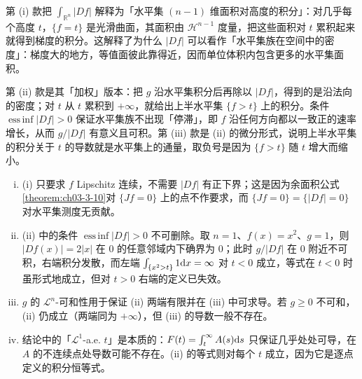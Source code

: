 \documentclass[../../main.tex]{subfiles}%
\begin{document}
\begin{remark}\label{remark:ch03-thm-3-13-动机}
第 (i) 款把 $\int_{\mathbb{R}^n}\lvert Df\rvert$ 解释为「水平集 $(n-1)$ 维面积对高度的积分」：对几乎每个高度 $t$，$\{f=t\}$ 是光滑曲面，其面积由 $\mathcal{H}^{n-1}$ 度量，把这些面积对 $t$ 累积起来就得到梯度的积分。这解释了为什么 $\lvert Df\rvert$ 可以看作「水平集族在空间中的密度」：梯度大的地方，等值面彼此靠得近，因而单位体积内包含更多的水平集面积。

第 (ii) 款是其「加权」版本：把 $g$ 沿水平集积分后再除以 $\lvert Df\rvert$，得到的是沿法向的密度；对 $t$ 从 $t$ 累积到 $+\infty$，就给出上半水平集 $\{f>t\}$ 上的积分。条件 $\operatorname*{ess\,inf}\lvert Df\rvert>0$ 保证水平集族不出现「停滞」，即 $f$ 沿任何方向都以一致正的速率增长，从而 $g/\lvert Df\rvert$ 有意义且可积。第 (iii) 款是 (ii) 的微分形式，说明上半水平集的积分关于 $t$ 的导数就是水平集上的通量，取负号是因为 $\{f>t\}$ 随 $t$ 增大而缩小。
\end{remark}

\begin{remark}\label{remark:ch03-thm-3-13-条件}
\begin{enumerate}[(i)]
\item (i) 只要求 $f$ Lipschitz 连续，不需要 $\lvert Df\rvert$ 有正下界；这是因为余面积公式\cref{theorem:ch03-3-10}对 $\{Jf=0\}$ 上的点不作要求，而 $\{Jf=0\}=\{\lvert Df\rvert=0\}$ 对水平集测度无贡献。%
\item (ii) 中的条件 $\operatorname*{ess\,inf}\lvert Df\rvert>0$ 不可删除。取 $n=1$、$f(x)=x^2$、$g=1$，则 $\lvert Df(x)\rvert=2\lvert x\rvert$ 在 $0$ 的任意邻域内下确界为 $0$；此时 $g/\lvert Df\rvert$ 在 $0$ 附近不可积，右端积分发散，而左端 $\int_{\{x^2>t\}}1\mathrm{d} x=\infty$ 对 $t<0$ 成立，等式在 $t<0$ 时虽形式地成立，但对 $t>0$ 右端的定义已失效。
\item $g$ 的 $\mathcal{L}^n$-可和性用于保证 (ii) 两端有限并在 (iii) 中可求导。若 $g\geqslant0$ 不可和，(ii) 仍成立（两端同为 $+\infty$），但 (iii) 的导数一般不存在。
\item 结论中的「$\mathcal{L}^1$-a.e. $t$」是本质的：$F(t)=\int_t^{\infty}A(s)\mathrm{d} s$ 只保证几乎处处可导，在 $A$ 的不连续点处导数可能不存在。(ii) 的等式则对每个 $t$ 成立，因为它是逐点定义的积分恒等式。
\end{enumerate}
\end{remark}
\end{document}
